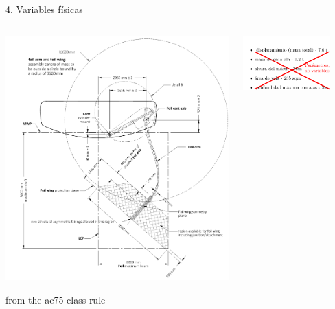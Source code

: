 \documentclass[presentation,aspectratio=169]{beamer}
\begin{document}
\begin{frame}[label={sec:orgca93bde}]{4. Variables físicas}
\begin{columns}
\begin{column}{0.5\columnwidth}
\begin{center}
\includegraphics[height=0.8\textheight]{../../figures/ac75-class-foil.png}
\end{center}

{\footnotesize from the ac75 class rule}
\end{column}
\begin{column}{0.5\columnwidth}
\begin{center}
\includegraphics[width=0.8\textwidth]{../../figures/parameters-not-variables}
\end{center}
\end{column}
\end{columns}
\end{frame}
\end{document}
